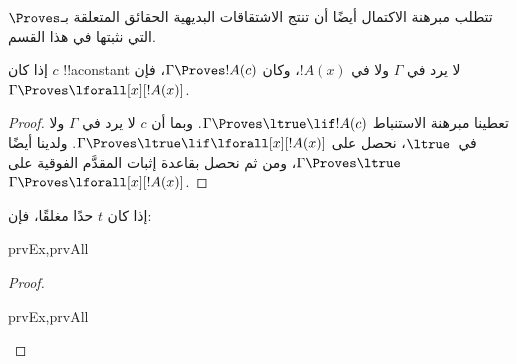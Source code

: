 \documentclass[../../../include/open-logic-section]{subfiles}
\begin{document}


\begin{explain}
  تتطلب مبرهنة الاكتمال أيضًا أن تنتج الاشتقاقات البديهية الحقائق
  المتعلقة بـ$\Proves$ التي نثبتها في هذا القسم.
\end{explain}

\begin{thm}
 إذا كان $c$ !!a{constant} لا يرد
في $\Gamma$ ولا في $!A(x)$، وكان $\Gamma \Proves !A(c)$، فإن $\Gamma
\Proves \lforall[x][!A(x)]$.
\end{thm}

\begin{proof}
تعطينا مبرهنة الاستنباط $\Gamma \Proves \ltrue \lif !A(c)$. وبما أن
$c$ لا يرد في $\Gamma$ ولا في~$\ltrue$، نحصل على $\Gamma \Proves
\ltrue \lif \lforall[x][!A(x)]$. ولدينا أيضًا $\Gamma \Proves
\ltrue$، ومن ثم نحصل بقاعدة إثبات المقدَّم الفوقية
 على $\Gamma \Proves \lforall[x][!A(x)]$.
\end{proof}

\begin{prop}
إذا كان $t$ حدًا مغلقًا، فإن:
\begin{tagenumerate}{prvEx,prvAll}

\end{tagenumerate}
\end{prop}

\begin{proof}
\begin{tagenumerate}{prvEx,prvAll}
\end{tagenumerate}
\end{proof}
\end{document}
